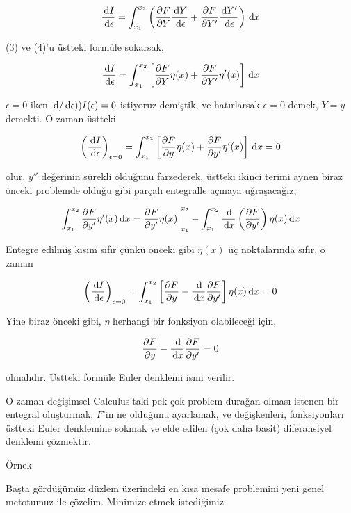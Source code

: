 \documentclass[12pt,fleqn]{article}\usepackage{../../common}
\begin{document}
$$
\frac{\,\mathrm{d} I}{\,\mathrm{d} \epsilon}  = 
\int_{x_1}^{x_2} \left(
\frac{\partial F}{\partial Y} \frac{\,\mathrm{d} Y}{\,\mathrm{d} \epsilon} + 
\frac{\partial F}{\partial Y'} \frac{\,\mathrm{d} Y'}{\,\mathrm{d} \epsilon} 
\right) \,\mathrm{d} x
$$

(3) ve (4)'u üstteki formüle sokarsak, 

$$
\frac{\,\mathrm{d} I}{\,\mathrm{d} \epsilon}  = 
\int_{x_1}^{x_2}
\left[
\frac{\partial F}{\partial Y} \eta(x) + 
\frac{\partial F}{\partial Y'} \eta'(x) 
\right] \,\mathrm{d} x
$$

$\epsilon = 0$ iken $\,\mathrm{d} / \,\mathrm{d} \epsilon) ) I(\epsilon) = 0$ istiyoruz
demiştik, ve hatırlarsak $\epsilon = 0$ demek, $Y = y$ demekti. O zaman
üstteki 

$$
\left( \frac{\,\mathrm{d} I}{\,\mathrm{d} \epsilon} \right)_{\epsilon = 0} = 
\int_{x_1}^{x_2}
\left[
\frac{\partial F}{\partial y} \eta(x) + 
\frac{\partial F}{\partial y'} \eta'(x) 
\right] \,\mathrm{d} x = 0
$$

olur. $y''$ değerinin sürekli olduğunu farzederek, üstteki ikinci terimi
aynen biraz önceki problemde olduğu gibi parçalı entegralle açmaya
uğraşacağız,

$$
\int_{x_1}^{x_2} \frac{\partial F}{\partial y'} \eta'(x) \,\mathrm{d} x = 
\frac{\partial F}{\partial y'} \eta(x) \bigg\vert_{x_1}^{x_2} - 
\int_{x_1}^{x_2} \frac{\,\mathrm{d} }{\,\mathrm{d} x} \left( \frac{\partial F}{\partial y'}  \right)
\eta(x) \,\mathrm{d} x
$$

Entegre edilmiş kısım sıfır çünkü önceki gibi $\eta(x)$ üç noktalarında
sıfır, o zaman 

$$
\left( \frac{\,\mathrm{d} I}{\,\mathrm{d} \epsilon} \right)_{\epsilon = 0} = 
\int_{x_1}^{x_2} \left[
\frac{\partial F}{\partial y} - 
\frac{\,\mathrm{d} }{\,\mathrm{d} x} \frac{\partial F}{\partial y'}
\right] \eta(x) \,\mathrm{d} x = 0
$$

Yine biraz önceki gibi, $\eta$ herhangi bir fonksiyon olabileceği için,

$$
\frac{\partial F}{\partial y} - 
\frac{\,\mathrm{d} }{\,\mathrm{d} x} \frac{\partial F}{\partial y'} = 0
$$

olmalıdır. Üstteki formüle Euler denklemi ismi verilir. 

O zaman değişimsel Calculus'taki pek çok problem durağan olması istenen bir
entegral oluşturmak, $F$'in ne olduğunu ayarlamak, ve değişkenleri,
fonksiyonları üstteki Euler denklemine sokmak ve elde edilen (çok daha
basit) diferansiyel denklemi çözmektir.

Örnek

Başta gördüğümüz düzlem üzerindeki en kısa mesafe problemini yeni genel
metotumuz ile çözelim. Minimize etmek istediğimiz
\end{document}
